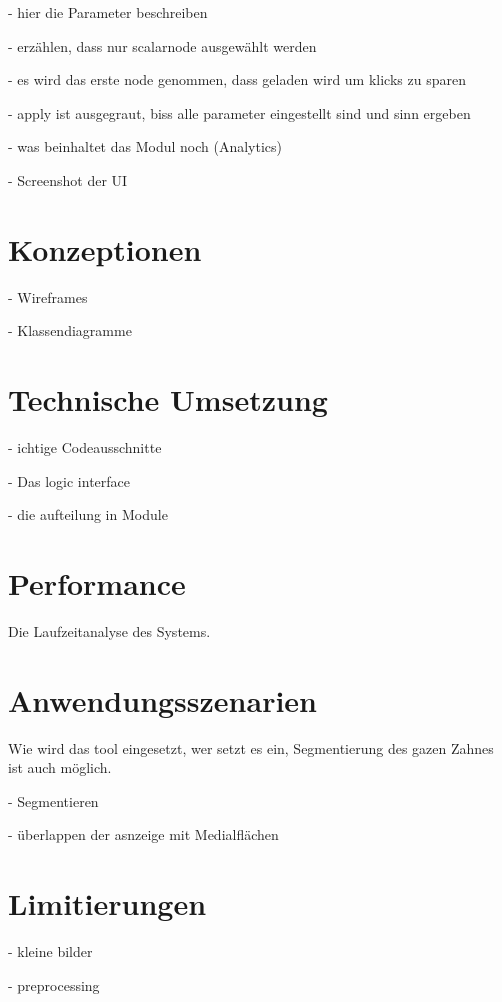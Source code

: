 - hier die Parameter beschreiben

- erzählen, dass nur scalarnode ausgewählt werden

- es wird das erste node genommen, dass geladen wird um klicks zu sparen

- apply ist ausgegraut, biss alle parameter eingestellt sind und sinn ergeben

- was beinhaltet das Modul noch (Analytics)

- Screenshot der UI


\section{Konzeptionen}
- Wireframes

- Klassendiagramme

\section{Technische Umsetzung}
- ichtige Codeausschnitte

- Das logic interface

- die aufteilung in Module

\section{Performance}
Die Laufzeitanalyse des Systems.

\section{Anwendungsszenarien}
Wie wird das tool eingesetzt, wer setzt es ein, Segmentierung des gazen Zahnes
ist auch möglich.

- Segmentieren

- überlappen der asnzeige mit Medialflächen


\section{Limitierungen}

- kleine bilder

- preprocessing

